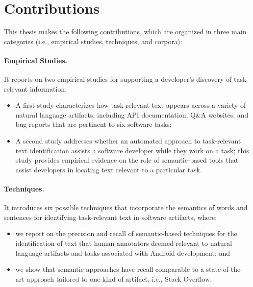 

\section{Contributions}
\label{cp1:contributions}

This thesis makes the following contributions, 
which are organized 
in three main categories
(i.e., empirical studies, techniques, and corpora):




\paragraph{\textbf{Empirical Studies.}} 

It reports on two empirical studies for supporting a developer's discovery of task-relevant information:

\begin{itemize}

    \item A first study characterizes how task-relevant text appears across a variety of natural language artifacts, including  API documentation, Q\&A websites, and
    bug reports that are pertinent to six software tasks; 

    \item A second study addresses whether 
    an automated approach to task-relevant text identification assists a software developer while they work on a task; this study provides empirical evidence on the role of semantic-based tools that assist developers in locating 
    text relevant to a particular task.
\end{itemize}




\paragraph{\textbf{Techniques.}} 

It introduces six possible techniques that incorporate the semantics of words and sentences for identifying task-relevant text in software artifacts, where:
    
\begin{itemize}
    
    \item we report on the precision and recall of semantic-based techniques for the identification of text that human annotators deemed relevant to natural language artifacts and tasks associated with Android development; and

    \item we show that semantic approaches have recall comparable to a state-of-the-art approach
    tailored to one kind of artifact, i.e., Stack Overflow.
\end{itemize}

